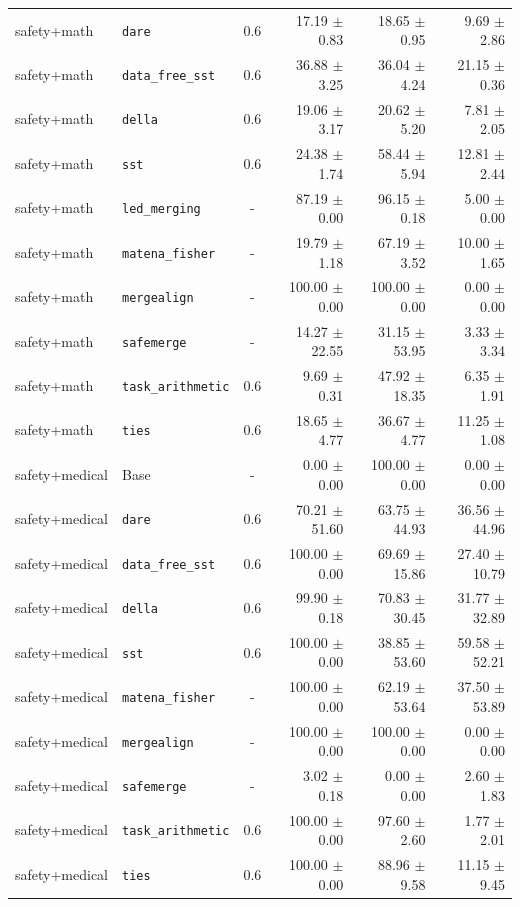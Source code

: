 \documentclass{article}
\begin{document}
\begin{table}[H]
{\begin{tabular}{llcrrr}
safety+math & \texttt{dare} & 0.6 & 17.19 $\pm$ 0.83 & 18.65 $\pm$ 0.95 & 9.69 $\pm$ 2.86 \\
safety+math & \texttt{data\_free\_sst} & 0.6 & 36.88 $\pm$ 3.25 & 36.04 $\pm$ 4.24 & 21.15 $\pm$ 0.36 \\
safety+math & \texttt{della} & 0.6 & 19.06 $\pm$ 3.17 & 20.62 $\pm$ 5.20 & 7.81 $\pm$ 2.05 \\
safety+math & \texttt{sst} & 0.6 & 24.38 $\pm$ 1.74 & 58.44 $\pm$ 5.94 & 12.81 $\pm$ 2.44 \\
safety+math & \texttt{led\_merging} & - & 87.19 $\pm$ 0.00 & 96.15 $\pm$ 0.18 & 5.00 $\pm$ 0.00 \\
safety+math & \texttt{matena\_fisher} & - & 19.79 $\pm$ 1.18 & 67.19 $\pm$ 3.52 & 10.00 $\pm$ 1.65 \\
safety+math & \texttt{mergealign} & - & 100.00 $\pm$ 0.00 & 100.00 $\pm$ 0.00 & 0.00 $\pm$ 0.00 \\
safety+math & \texttt{safemerge} & - & 14.27 $\pm$ 22.55 & 31.15 $\pm$ 53.95 & 3.33 $\pm$ 3.34 \\
safety+math & \texttt{task\_arithmetic} & 0.6 & 9.69 $\pm$ 0.31 & 47.92 $\pm$ 18.35 & 6.35 $\pm$ 1.91 \\
safety+math & \texttt{ties} & 0.6 & 18.65 $\pm$ 4.77 & 36.67 $\pm$ 4.77 & 11.25 $\pm$ 1.08 \\
\midrule
safety+medical & Base & - & 0.00 $\pm$ 0.00 & 100.00 $\pm$ 0.00 & 0.00 $\pm$ 0.00 \\
safety+medical & \texttt{dare} & 0.6 & 70.21 $\pm$ 51.60 & 63.75 $\pm$ 44.93 & 36.56 $\pm$ 44.96 \\
safety+medical & \texttt{data\_free\_sst} & 0.6 & 100.00 $\pm$ 0.00 & 69.69 $\pm$ 15.86 & 27.40 $\pm$ 10.79 \\
safety+medical & \texttt{della} & 0.6 & 99.90 $\pm$ 0.18 & 70.83 $\pm$ 30.45 & 31.77 $\pm$ 32.89 \\
safety+medical & \texttt{sst} & 0.6 & 100.00 $\pm$ 0.00 & 38.85 $\pm$ 53.60 & 59.58 $\pm$ 52.21 \\
safety+medical & \texttt{matena\_fisher} & - & 100.00 $\pm$ 0.00 & 62.19 $\pm$ 53.64 & 37.50 $\pm$ 53.89 \\
safety+medical & \texttt{mergealign} & - & 100.00 $\pm$ 0.00 & 100.00 $\pm$ 0.00 & 0.00 $\pm$ 0.00 \\
safety+medical & \texttt{safemerge} & - & 3.02 $\pm$ 0.18 & 0.00 $\pm$ 0.00 & 2.60 $\pm$ 1.83 \\
safety+medical & \texttt{task\_arithmetic} & 0.6 & 100.00 $\pm$ 0.00 & 97.60 $\pm$ 2.60 & 1.77 $\pm$ 2.01 \\
safety+medical & \texttt{ties} & 0.6 & 100.00 $\pm$ 0.00 & 88.96 $\pm$ 9.58 & 11.15 $\pm$ 9.45 \\
\bottomrule
\end{tabular}
}
\end{table}
\end{document}
